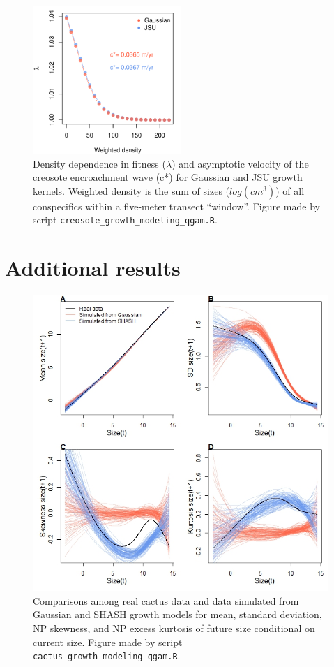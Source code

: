 \documentclass[12pt]{article}
\begin{document}
\begin{figure}[tbp]
	\centering
	\includegraphics[width=0.5\textwidth]{figures/creosote_DD_lambda.pdf}
	\caption{Density dependence in fitness ($\lambda$) and asymptotic velocity of the creosote encroachment wave (c*) for Gaussian and JSU growth kernels. Weighted density is the sum of sizes ($log(cm^3)$) of all conspecifics within a five-meter transect ``window''. Figure made by script \texttt{creosote\_growth\_modeling\_qgam.R}.}
	\label{fig:creosote_lambda_cstar}
\end{figure}

 \section{Additional results}
 
 \begin{figure}[tbp]
 	\centering
 	\includegraphics[width=1.0\textwidth]{figures/cactus_SHASH_fit.jpg}
 	\caption{Comparisons among real cactus data and data simulated from Gaussian and SHASH growth models for mean, standard deviation, NP skewness, and NP excess kurtosis of future size conditional on current size. Figure made by script \texttt{cactus\_growth\_modeling\_qgam.R}.}
 	\label{fig:cactus_fit}
 \end{figure} 
\end{document}
